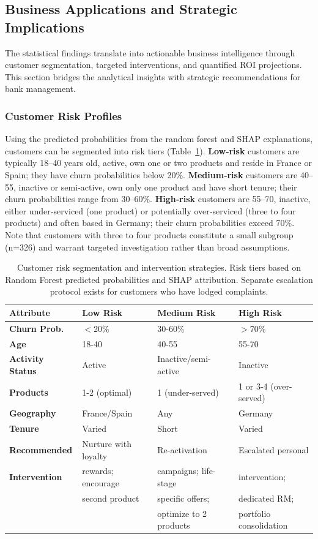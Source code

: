 \documentclass[12pt]{article}
\begin{document}
\subsection{Business Applications and Strategic Implications}
The statistical findings translate into actionable business intelligence through customer segmentation, targeted interventions, and quantified ROI projections. This section bridges the analytical insights with strategic recommendations for bank management.

\subsubsection{Customer Risk Profiles}
Using the predicted probabilities from the random forest and SHAP explanations, customers can be segmented into risk tiers (Table~\ref{tab:risk_profiles}). \textbf{Low‑risk} customers are typically 18–40 years old, active, own one or two products and reside in France or Spain; they have churn probabilities below 20\%. \textbf{Medium‑risk} customers are 40–55, inactive or semi‑active, own only one product and have short tenure; their churn probabilities range from 30–60\%. \textbf{High‑risk} customers are 55–70, inactive, either under‑serviced (one product) or potentially over‑serviced (three to four products) and often based in Germany; their churn probabilities exceed 70\%. Note that customers with three to four products constitute a small subgroup (n=326) and warrant targeted investigation rather than broad assumptions.

\begin{table}[H]
\centering
\small
\caption{Customer risk segmentation and intervention strategies. Risk tiers based on Random Forest predicted probabilities and SHAP attribution. Separate escalation protocol exists for customers who have lodged complaints.}
\label{tab:risk_profiles}
\begin{tabular}{p{3.5cm}p{3.5cm}p{3.5cm}p{3.5cm}}
\toprule
\textbf{Attribute} & \textbf{Low Risk} & \textbf{Medium Risk} & \textbf{High Risk} \\
\midrule
\rowcolor{gray!8}\textbf{Churn Prob.} & $<$20\% & 30-60\% & $>$70\% \\
\textbf{Age} & 18-40 & 40-55 & 55-70 \\
\rowcolor{gray!8}\textbf{Activity Status} & Active & Inactive/semi-active & Inactive \\
\textbf{Products} & 1-2 (optimal) & 1 (under-served) & 1 or 3-4 (over-served) \\
\rowcolor{gray!8}\textbf{Geography} & France/Spain & Any & Germany \\
\textbf{Tenure} & Varied & Short & Varied \\
\midrule
\textbf{Recommended} & Nurture with loyalty & Re-activation & Escalated personal \\
\textbf{Intervention} & rewards; encourage & campaigns; life-stage & intervention; \\
& second product & specific offers; & dedicated RM; \\
& & optimize to 2 products & portfolio consolidation \\
\bottomrule
\end{tabular}
\end{table}
\end{document}
